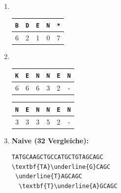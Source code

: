 \documentclass[11pt,a4paper]{article}
\begin{document}
\begin{loesung}
    \begin{enumerate}
        \item \ \\
        \begin{table}[h!]
            \centering
            \begin{tabular}{|c|c|c|c|c|}
                \hline
                \texttt{B} &\texttt{D} &\texttt{E} &\texttt{N} &\texttt{*} \\
                \hline
                6 & 2 & 1 & 0 & 7 \\
                \hline
            \end{tabular}
        \end{table}
        \FloatBarrier

        \item \ \\
        \begin{table}[h!]
            \centering
            \parbox{0.25\linewidth}{
                \centering
                \begin{tabular}{|c|c|c|c|c|c|}
                    \hline
                    \texttt{K} & \texttt{E} & \texttt{N} & \texttt{N} & \texttt{E} & \texttt{N} \\
                    \hline
                    6 & 6 & 6 & 3 & 2 & - \\
                    \hline
                \end{tabular}
            }
            \parbox{0.25\linewidth}{
                \centering
                \begin{tabular}{|c|c|c|c|c|c|}
                    \hline
                    \texttt{N} & \texttt{E} & \texttt{N} & \texttt{N} & \texttt{E} & \texttt{N} \\
                    \hline
                    3 & 3 & 3 & 5 & 2 & - \\
                    \hline
                \end{tabular}
            }
        \end{table}
        \item \textbf{Naive\textnormal{ (32 Vergleiche)}:}\\
        \begin{minipage}[t]{0.45\textwidth}
        \begin{Verbatim}[commandchars=\\\{\}]
TATGCAAGCTGCCATGCTGTAGCAGC
\textbf{TA}\underline{G}CAGC
 \underline{T}AGCAGC
  \textbf{T}\underline{A}GCAGC

\end{Verbatim}
\end{minipage}
\end{enumerate}
\end{loesung}
\end{document}
